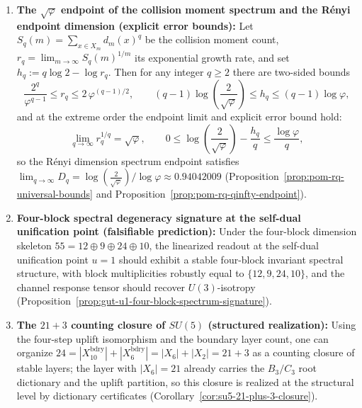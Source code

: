 \begin{theorem}
\begin{enumerate}
  \item \textbf{The \texorpdfstring{$\sqrt{\varphi}$}{sqrt(phi)} endpoint of the collision moment spectrum and the R\'enyi endpoint dimension (explicit error bounds):}
  Let \(S_q(m)=\sum_{x\in X_m}d_m(x)^q\) be the collision moment count, \(r_q=\lim_{m\to\infty}S_q(m)^{1/m}\) its exponential growth rate, and set \(h_q:=q\log 2-\log r_q\).
  Then for any integer \(q\ge 2\) there are two-sided bounds
  \[
  \frac{2^q}{\varphi^{q-1}}\le r_q\le 2\,\varphi^{(q-1)/2},
  \qquad
  (q-1)\log\!\left(\frac{2}{\sqrt{\varphi}}\right)\le h_q\le (q-1)\log\varphi,
  \]
  and at the extreme order the endpoint limit and explicit error bound hold:
  \[
  \lim_{q\to\infty} r_q^{1/q}=\sqrt{\varphi},\qquad
  0\le \log\!\left(\frac{2}{\sqrt{\varphi}}\right)-\frac{h_q}{q}\le \frac{\log\varphi}{q},
  \]
  so the R\'enyi dimension spectrum endpoint satisfies
  \(
  \lim_{q\to\infty}D_q=\log\!\left(\frac{2}{\sqrt{\varphi}}\right)/\log\varphi\approx 0.94042009
  \)
  (Proposition~\ref{prop:pom-rq-universal-bounds} and Proposition~\ref{prop:pom-rq-qinfty-endpoint}).

  \item \textbf{Four-block spectral degeneracy signature at the self-dual unification point (falsifiable prediction):}
  Under the four-block dimension skeleton \(55=12\oplus 9\oplus 24\oplus 10\), the linearized readout at the self-dual unification point \(u=1\) should exhibit a stable four-block invariant spectral structure, with block multiplicities robustly equal to \(\{12,9,24,10\}\), and the channel response tensor should recover \(U(3)\)-isotropy (Proposition~\ref{prop:gut-u1-four-block-spectrum-signature}).

  \item \textbf{The \(21+3\) counting closure of \texorpdfstring{$SU(5)$}{SU(5)} (structured realization):}
  Using the four-step uplift isomorphism and the boundary layer count, one can organize
  \(
  24=|X_{10}^{\mathrm{bdry}}|+|X_6^{\mathrm{bdry}}|
  =|X_6|+|X_2|=21+3
  \)
  as a counting closure of stable layers; the layer with \(|X_6|=21\) already carries the \(B_3/C_3\) root dictionary and the uplift partition, so this closure is realized at the structural level by dictionary certificates (Corollary~\ref{cor:su5-21-plus-3-closure}).
\end{enumerate}
\end{theorem}

